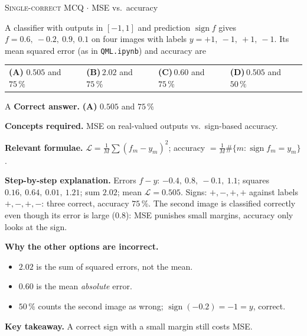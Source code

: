\documentclass[11pt,a4paper]{article}
\newcommand{\optlabel}[1]{\textbf{(#1)}}
\newcommand{\correctlabel}[1]{\textcolor{okgreen}{\textbf{(#1)}\,\ding{51}}}
\newenvironment{qitem}[1]{\begin{list}{}{\setlength{\leftmargin}{3.3em}\setlength{\labelwidth}{3.1em}%
  \setlength{\labelsep}{0.2em}\setlength{\topsep}{3pt}\setlength{\parsep}{3pt}}\item[\textbf{Q.#1}\hfill]}{\end{list}}
\newcommand{\qsep}{\par\vspace{2pt}{\color{black!15}\hrule}\vspace{4pt}}
\newcommand{\qmeta}[2]{{\footnotesize\color{black!60}\textsc{#1} \;$\cdot$\; #2}\par}
\begin{document}
\begin{qitem}{52}
\qmeta{Single-correct MCQ}{MSE vs.\ accuracy}
A classifier with outputs in $[-1, 1]$ and prediction $\operatorname{sign} f$ gives $f = 0.6,\ -0.2,\ 0.9,\ 0.1$ on four
images with labels $y = +1,\ -1,\ +1,\ -1$. Its mean squared error (as in \texttt{QML.ipynb}) and accuracy are
\par\smallskip\noindent\begin{tabularx}{\linewidth}{@{}*{4}{L}@{}}
\correctlabel{A}\,$0.505$ and $75\,\%$ & \optlabel{B}\,$2.02$ and $75\,\%$ & \optlabel{C}\,$0.60$ and $75\,\%$ & \optlabel{D}\,$0.505$ and $50\,\%$
\end{tabularx}
\end{qitem}
\begin{solbox}{A}
\textbf{\color{brand}Correct answer.} \textcolor{okgreen}{\textbf{(A)}} $0.505$ and $75\,\%$

\textbf{\color{brand}Concepts required.} MSE on real-valued outputs vs.\ sign-based accuracy.

\textbf{\color{brand}Relevant formulae.} $\mathcal L = \frac1M\sum(f_m - y_m)^2$; accuracy $= \frac1M\#\{m: \operatorname{sign}f_m = y_m\}$.

\textbf{\color{brand}Step-by-step explanation.} Errors $f - y$: $-0.4,\ 0.8,\ -0.1,\ 1.1$; squares $0.16,\ 0.64,\ 0.01,\ 1.21$; sum $2.02$; mean $\mathcal L = 0.505$.
Signs: $+, -, +, +$ against labels $+, -, +, -$: three correct, accuracy $75\,\%$. The second image is classified correctly even
though its error is large ($0.8$): MSE punishes small margins, accuracy only looks at the sign.

\textbf{\color{brand}Why the other options are incorrect.}
\begin{itemize}[leftmargin=2.4em, itemsep=1pt, topsep=2pt]
\item[\textbf{(B)}] $2.02$ is the sum of squared errors, not the mean.
\item[\textbf{(C)}] $0.60$ is the mean \emph{absolute} error.
\item[\textbf{(D)}] $50\,\%$ counts the second image as wrong; $\operatorname{sign}(-0.2) = -1 = y$, correct.
\end{itemize}
\textbf{\color{brand}Key takeaway.} A correct sign with a small margin still costs MSE.
\end{solbox}
\qsep
\end{document}

